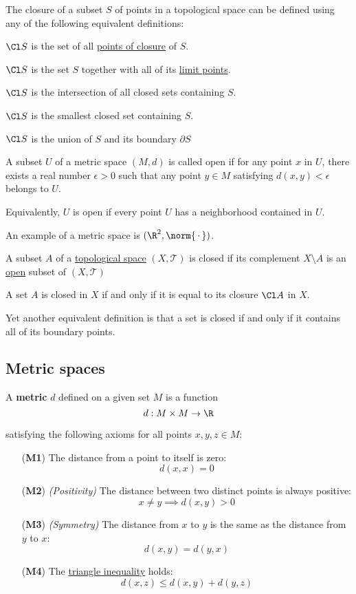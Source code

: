 The closure of a subset $S$ of points in a topological space can be defined
using any of the following equivalent definitions:
\begin{enumerati}
  \item $\Cl S$ is the set of all \href{f928932}{points of closure} of $S$.
  \item $\Cl S$ is the set $S$ together with all of its \href{f928932}{limit
  points}.
  \item $\Cl S$ is the intersection of all closed sets containing $S$.
  \item $\Cl S$ is the smallest closed set containing $S$.
  \item $\Cl S$ is the union of $S$ and its boundary $\partial S$
\end{enumerati}

\label{dd04b4d}

A subset $U$ of a metric space $(M,d)$ is called open if for any point $x$ in
$U$, there exists a real number $\epsilon>0$ such that any point $y\in M$
satisfying $d(x,y)<\epsilon$ belongs to $U$.

Equivalently, $U$ is open if every point $U$ has a neighborhood contained in
$U$.

An example of a metric space is $(\R^2,\norm{\,\cdot\,})$.

\label{deadb92}

A subset $A$ of a \href{de3c1b1}{topological space} $(X,\mathcal T)$ is closed
if its complement $X\setminus A$ is an \href{dd04b4d}{open} subset of
$(X,\mathcal T)$

A set $A$ is closed in $X$ if and only if it is equal to its closure $\Cl A$ in
$X$.

Yet another equivalent definition is that a set is closed if and only if it
contains all of its boundary points.

\nextsection
\subsection{Metric spaces}\label{db384c3}

\label{d23883d}

A \textbf{metric} $d$ defined on a given set $M$ is a function
$$
  d:M\times M\to\R
$$

satisfying the following axioms for all points $x,y,z\in M$:
\begin{itemize}
  \item[(\textbf{M1})] The distance from a point to itself is zero:
        $$
          d(x,x)=0
        $$
  \item[(\textbf{M2})] \textit{(Positivity)} The distance between two
        distinct points is always positive:
        $$
          x\neq y\implies d(x,y)>0
        $$
  \item[(\textbf{M3})]\textit{(Symmetry)} The distance from $x$ to $y$ is the
        same as the distance from $y$ to $x$:
        $$
          d(x,y)=d(y,x)
        $$
  \item[(\textbf{M4})] The \href{f1288ad}{triangle inequality} holds:
        $$
          d(x,z)\leq d(x,y)+d(y,z)
        $$
\end{itemize}

